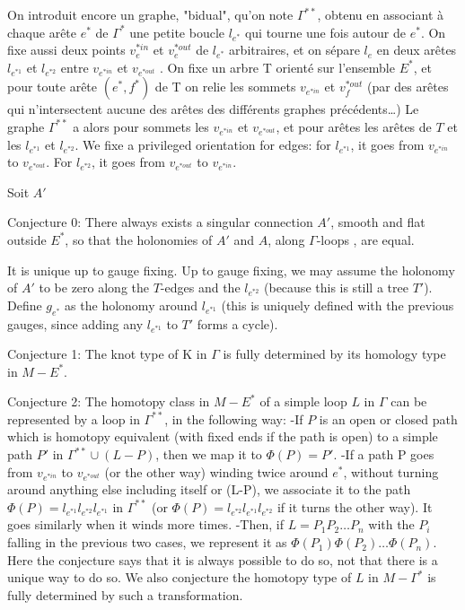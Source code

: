 \documentclass[10pt]{article}
\begin{document}
On introduit encore un graphe, "bidual", qu'on note $\Gamma^{**}$, obtenu en associant à chaque arête $e^*$ de $\Gamma^*$ une petite boucle $l_{e^*}$ qui tourne une fois autour de $e^*$. On fixe aussi deux points $v_e^{*in}$ et $v_e^{*out}$ de $l_{e^*}$ arbitraires, et on sépare $l_e$ en deux arêtes $l_{e^{*1}}$ et $l_{e^{*2}}$ entre $v_{e^{*in}}$ et $v_{e^{*out}}$ . On fixe un arbre T orienté sur l'ensemble $E^*$, et pour toute arête $(e^*,f^*)$ de T on  relie les sommets $v_{e^{*in}} $ et $v_f^{*out}$ (par des arêtes qui n'intersectent aucune des arêtes des différents graphes précédents\dots )
 Le graphe $\Gamma^{**}$ a alors pour sommets les $v_{e^{*in}}$ et $v_{e^{*out}}$, et pour arêtes les arêtes de $T$ et les $l_{e^{*1}}$ et $l_{e^{*2}}$. We fixe a privileged orientation for edges: for $l_{e^{*1}}$, it goes from $v_{e^{*in}}$ to $v_{e^{*out}}$. For $l_{e^{*2}}$, it goes from $v_{e^{*out}}$ to $v_{e^{*in}}$.

Soit $A'$

Conjecture 0: There always exists a singular connection $A'$, smooth and flat outside $E^*$, so that the holonomies of $A'$ and $A$, along $\Gamma$-loops , are equal.

It is unique up to gauge fixing. Up to gauge fixing, we may assume the holonomy of $A'$ to be zero along the $T$-edges and the  $l_{e^{*2}}$ (because this is still a tree $T'$). Define $g_{e^*}$ as the holonomy around $l_{e^{*1}}$ (this is uniquely defined with the previous gauges, since adding any $l_{e^{*1}}$ to $T'$ forms a cycle).

Conjecture 1: The knot type of K in $\Gamma$ is fully determined by its homology type in $M-E^*$.

Conjecture 2: The homotopy class in $M-E^*$  of a simple loop $L$ in $\Gamma$  can be represented by a loop in $\Gamma^{**}$, in the following way:
-If $P$ is an open or closed path which is homotopy equivalent (with fixed ends if the path is open) to a simple path $P'$ in $\Gamma^{**}\cup (L-P)$, then we map it to $\Phi(P)=P'$.
-If a path P goes from $v_{e^{*in}}$ to $v_{e^{*out}}$ (or the other way) winding twice around $e^*$, without turning around anything else including itself or (L-P), we associate it to the path $\Phi(P)= l_{e^{*1}}l_{e^{*2}}l_{e^{*1}} $ in $\Gamma^{**}$ (or $\Phi(P)=l_{e^{*2}}l_{e^{*1}}l_{e^{*2}}$ if it turns the other way). It goes similarly when it winds more times.
-Then, if $L=P_1 P_2 \dots P_n$ with the $P_i$ falling in the previous two cases, we represent it as $\Phi(P_1)\Phi(P_2)\dots\Phi(P_n)$.
Here the conjecture says that it is always possible to do so, not that there is a unique way to do so. We also conjecture the homotopy type of $L$ in $M-\Gamma^*$ is fully determined by such a transformation.
\end{document}
